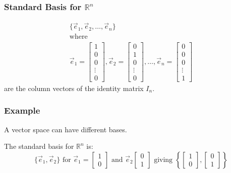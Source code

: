         \subsubsection{Standard Basis for $\mathbb{R}^n$}
        \begin{equation}\label{eq:basis_for_rn}
        \begin{aligned}
            \{\vec{e}_1, \vec{e}_2, \ldots, \vec{e}_n\}\\
            \text{where}\\
            \vec{e}_1 = \left[ \begin{array}{c}
                1\\
                0\\
                0\\
                \vdots\\
                0
            \end{array}\right],
            \vec{e}_2 = \left[ \begin{array}{c}
                0\\
                1\\
                0\\
                \vdots\\
                0
            \end{array}\right], \ldots,
            \vec{e}_n = \left[ \begin{array}{c}
                0\\
                0\\
                0\\
                \vdots\\
                1
            \end{array}\right]
        \end{aligned}
        \end{equation}
        are the column vectors of the identity matrix $I_n$.

        \subsubsection{Example}
        A vector space can have different bases.

        The standard basis for $\mathbb{R}^n$ is:
        \[
        \{\vec{e}_1, \vec{e}_2\} \text{ for } \vec{e}_1 =
        \left[ \begin{array}{c}
        1\\
        0
        \end{array}\right] \text{ and } \vec{e}_2
        \left[ \begin{array}{c}
        0\\
        1
        \end{array}\right] \text{ giving }
        \left\{ \left[ \begin{array}{c}
        1\\
        0
        \end{array}\right],
        \left[ \begin{array}{c}
        0\\
        1
        \end{array}\right]\right\}
        \]

